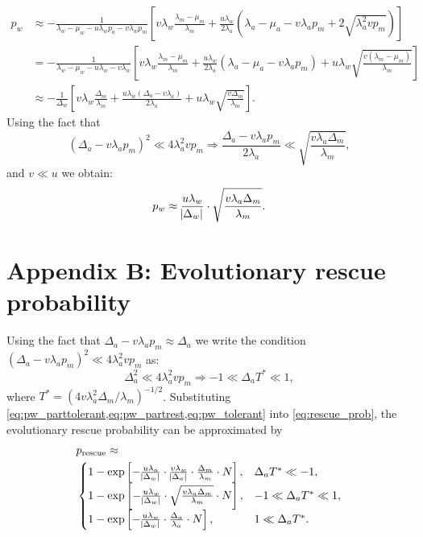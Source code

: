 \documentclass[12pt]{extarticle}
\newcommand{\presc}{p_\text{rescue}}
\begin{document}
\begin{appendices}
\begin{equation}
\begin{aligned}
p_w&\approx-\frac{1}{\lambda_w-\mu_w-u\lambda_wp_a-v\lambda_wp_m}\left[v\lambda_w\frac{\lambda_m-\mu_m}{\lambda_m}+\frac{u\lambda_w}{2\lambda_a}\left(\lambda_a-\mu_a-v\lambda_ap_m+2\sqrt{\lambda_a^2vp_m}\right)\right]\\
&=-\frac{1}{\lambda_w-\mu_w-u\lambda_w-v\lambda_w}\left[v\lambda_w\frac{\lambda_m-\mu_m}{\lambda_m}+\frac{u\lambda_w}{2\lambda_a}\left(\lambda_a-\mu_a-v\lambda_ap_m\right)+u\lambda_w\sqrt{\frac{v\left(\lambda_m-\mu_m\right)}{\lambda_m}}\right]\\
&\approx-\frac{1}{\Delta_w}\left[v\lambda_w\frac{\Delta_m}{\lambda_m}+\frac{u\lambda_w\left(\Delta_a-v\lambda_a\right)}{2\lambda_a}+u\lambda_w\sqrt{\frac{v\Delta_m}{\lambda_m}}\right].
\end{aligned}
\end{equation}
Using the fact that
\begin{equation*}
\left(\Delta_a-v\lambda_ap_m\right)^2 \ll 4\lambda_a^2vp_m\Rightarrow\frac{\Delta_a-v\lambda_ap_m}{2\lambda_a} \ll \sqrt{\frac{v\lambda_a\Delta_m}{\lambda_m}},
\end{equation*}
and $v\ll u$ we obtain:
\begin{equation}\label{eq:pw_partrest}
p_w\approx\frac{u\lambda_w}{\abs{\Delta_w}}\cdot\sqrt{\frac{v\lambda_a\Delta_m}{\lambda_m}}.
\end{equation}

\section*{Appendix B: Evolutionary rescue probability}\label{sec:appendix-rescue-prob}
Using the fact that $\Delta_a-v\lambda_ap_m\approx\Delta_a$ we write the condition $\left(\Delta_a-v\lambda_ap_m\right)^2 \ll 4\lambda_a^2vp_m$ as:
\begin{equation*}
\Delta_a^2 \ll 4\lambda_a^2vp_m\Rightarrow -1\ll\Delta_aT^*\ll1,
\end{equation*}
where $T^* = (4 v \lambda_a^2 \Delta_m/\lambda_m)^{-1/2}$.
Substituting \cref{eq:pw_parttolerant,eq:pw_partrest,eq:pw_tolerant} into \cref{eq:rescue_prob}, the evolutionary rescue probability can be approximated by
\begin{equation}\label{rescue_prob_approx}
\begin{aligned}
&\presc \approx \\
  &\begin{cases}
   1-\exp\left[-\frac{u\lambda_a}{\abs{\Delta_w}}\cdot\frac{v\lambda_w}{\abs{\Delta_a}}\cdot\frac{\Delta_m}{\lambda_m}\cdot N\right] ,&
   \Delta_aT^*\ll-1 ,\\
   1-\exp\left[-\frac{u\lambda_w}{\abs{\Delta_w}}\cdot\sqrt{\frac{v\lambda_a\Delta_m}{\lambda_m}}\cdot N\right] ,&
  -1\ll\Delta_aT^*\ll1 ,\\
   1-\exp\left[-\frac{u\lambda_w}{\abs{\Delta_w}} \cdot \frac{\Delta_a}{\lambda_a}\cdot N\right] ,&
   1\ll\Delta_aT^*.
  \end{cases}
\end{aligned}
\end{equation}


\end{appendices}
\end{document}
